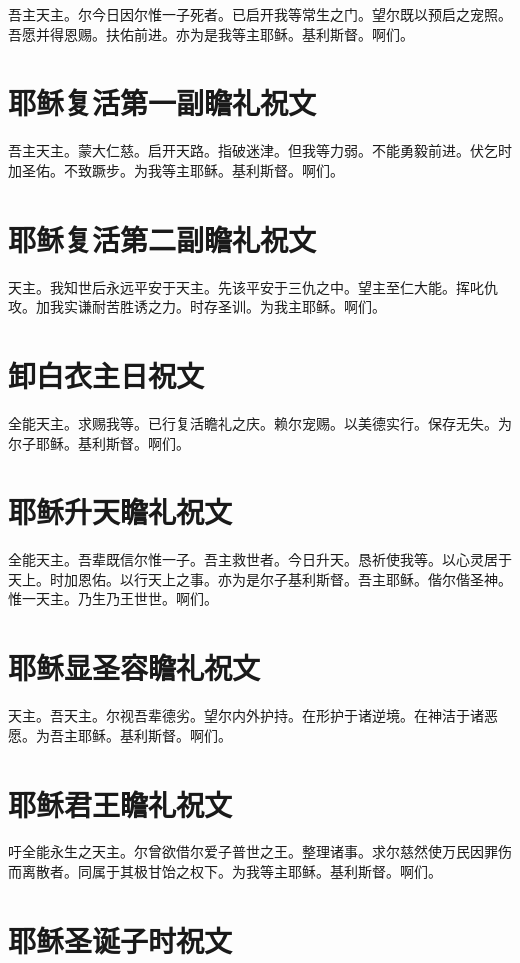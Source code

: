 \documentclass[UTF8,17pt]{ctexart}
\begin{document}
吾主天主。尔今⽇因尔惟⼀⼦死者。已启开我等常⽣之门。望尔既以预启之宠照。吾愿并得恩赐。扶佑前进。亦为是我等主耶稣。基利斯督。啊们。

\section{耶稣复活第⼀副瞻礼祝⽂}

吾主天主。蒙⼤仁慈。启开天路。指破迷津。但我等⼒弱。不能勇毅前进。伏乞时加圣佑。不致蹶步。为我等主耶稣。基利斯督。啊们。

\section{耶稣复活第⼆副瞻礼祝⽂}

天主。我知世后永远平安于天主。先该平安于三仇之中。望主⾄仁⼤能。挥叱仇攻。加我实谦耐苦胜诱之⼒。时存圣训。为我主耶稣。啊们。

\section{卸⽩⾐主⽇祝⽂}

全能天主。求赐我等。已⾏复活瞻礼之庆。赖尔宠赐。以美德实⾏。保存⽆失。为尔⼦耶稣。基利斯督。啊们。

\section{耶稣升天瞻礼祝⽂}

全能天主。吾辈既信尔惟⼀⼦。吾主救世者。今⽇升天。恳祈使我等。以⼼灵居于天上。时加恩佑。以⾏天上之事。亦为是尔⼦基利斯督。吾主耶稣。偕尔偕圣神。惟⼀天主。乃⽣乃王世世。啊们。

\section{耶稣显圣容瞻礼祝⽂}

天主。吾天主。尔视吾辈德劣。望尔内外护持。在形护于诸逆境。在神洁于诸恶愿。为吾主耶稣。基利斯督。啊们。

\section{耶稣君王瞻礼祝⽂}

吁全能永⽣之天主。尔曾欲借尔爱⼦普世之王。整理诸事。求尔慈然使万民因罪伤⽽离散者。同属于其极⽢饴之权下。为我等主耶稣。基利斯督。啊们。

\section{耶稣圣诞⼦时祝文}
\end{document}
